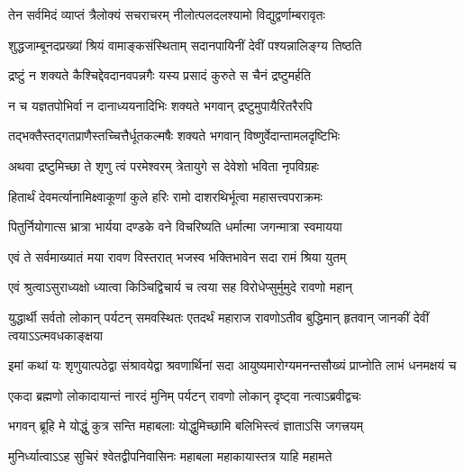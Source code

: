\twolineshloka
{तेन सर्वमिदं व्याप्तं त्रैलोक्यं सचराचरम्}
{नीलोत्पलदलश्यामो विद्युद्वर्णाम्बरावृतः} %

\twolineshloka
{शुद्धजाम्बूनदप्रख्यां श्रियं वामाङ्कसंस्थिताम्}
{सदानपायिनीं देवीं पश्यन्नालिङ्ग्य तिष्ठति} %

\twolineshloka
{द्रष्टुं न शक्यते कैश्चिद्देवदानवपन्नगैः}
{यस्य प्रसादं कुरुते स चैनं द्रष्टुमर्हति} %

\twolineshloka
{न च यज्ञतपोभिर्वा न दानाध्ययनादिभिः}
{शक्यते भगवान् द्रष्टुमुपायैरितरैरपि} %

\twolineshloka
{तद्भक्तैस्तद्गतप्राणैस्तच्चित्तैर्धूतकल्मषैः}
{शक्यते भगवान् विष्णुर्वेदान्तामलदृष्टिभिः} %

\twolineshloka
{अथवा द्रष्टुमिच्छा ते शृणु त्वं परमेश्वरम्}
{त्रेतायुगे स देवेशो भविता नृपविग्रहः} %

\twolineshloka
{हितार्थं देवमर्त्यानामिक्ष्वाकूणां कुले हरिः}
{रामो दाशरथिर्भूत्वा महासत्त्वपराक्रमः} %

\twolineshloka
{पितुर्नियोगात्स भ्रात्रा भार्यया दण्डके वने}
{विचरिष्यति धर्मात्मा जगन्मात्रा स्वमायया} %

\twolineshloka
{एवं ते सर्वमाख्यातं मया रावण विस्तरात्}
{भजस्व भक्तिभावेन सदा रामं श्रिया युतम्} %


\twolineshloka
{एवं श्रुत्वाऽसुराध्यक्षो ध्यात्वा किञ्चिद्विचार्य च}
{त्वया सह विरोधेप्सुर्मुमुदे रावणो महान्} %

\threelineshloka
{युद्धार्थी सर्वतो लोकान् पर्यटन् समवस्थितः}
{एतदर्थं महाराज रावणोऽतीव बुद्धिमान्}
{हृतवान् जानकीं देवीं त्वयाऽऽत्मवधकाङ्क्षया} %

\fourlineindentedshloka
{इमां कथां यः शृणुयात्पठेद्वा}
{संश्रावयेद्वा श्रवणार्थिनां सदा}
{आयुष्यमारोग्यमनन्तसौख्यं}
{प्राप्नोति लाभं धनमक्षयं च} %






\twolineshloka
{एकदा ब्रह्मणो लोकादायान्तं नारदं मुनिम्}
{पर्यटन् रावणो लोकान् दृष्ट्वा नत्वाऽब्रवीद्वचः} %

\twolineshloka
{भगवन् ब्रूहि मे योद्धुं कुत्र सन्ति महाबलाः}
{योद्धुमिच्छामि बलिभिस्त्वं ज्ञाताऽसि जगत्त्रयम्} %

\twolineshloka
{मुनिर्ध्यात्वाऽऽह सुचिरं श्वेतद्वीपनिवासिनः}
{महाबला महाकायास्तत्र याहि महामते} %

